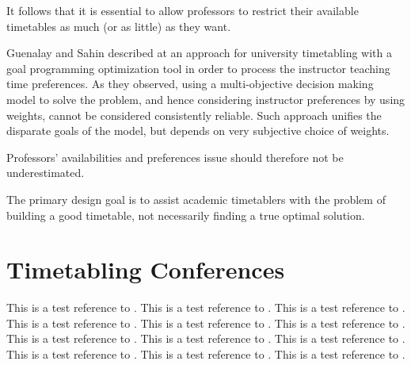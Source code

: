 It follows that it is essential to allow professors to restrict their available timetables as much (or as little) as they want.

Guenalay and Sahin described at \cite{Guenalay2006} an approach for university timetabling with a goal programming optimization tool in order to process the instructor teaching time preferences. As they observed, using a multi-objective decision making model to solve the problem, and hence considering instructor preferences by using weights, cannot be considered consistently reliable. Such approach unifies the disparate goals of the model, but depends on very subjective choice of weights.

Professors' availabilities and preferences issue should therefore not be underestimated.


The primary design goal is to assist academic timetablers with the problem of building a good timetable, not necessarily finding a true optimal solution.


\section{Timetabling Conferences}





This is a test reference to \cite{Carter2001}.    %
This is a test reference to \cite{Murray2007}.    %
This is a test reference to \cite{Unitime}.       %
This is a test reference to \cite{DSS}.           %
This is a test reference to \cite{Guenalay2006}.  %
This is a test reference to \cite{Mimosasoftware}.
This is a test reference to \cite{Patat}.
This is a test reference to \cite{Hstt}.				  %
This is a test reference to \cite{ITC2007}.				%
This is a test reference to \cite{Ectt}.					%
This is a test reference to \cite{Udine}.
This is a test reference to \cite{Watt}.					%





